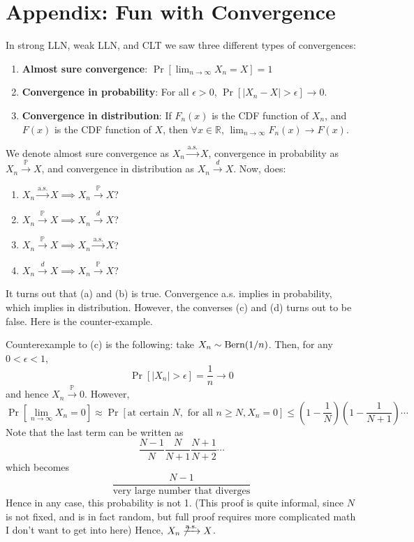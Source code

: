 \documentclass[11pt]{article}
\theoremstyle{definition}
\theoremstyle{remark}
\newcommand{\convas}{\xrightarrow{\text{a.s.}}}
\newcommand{\convprob}{\xrightarrow{\mathbb{P}}}
\newcommand{\convdist}{\xrightarrow{d}}
\newcommand{\R}{\mathbb{R}}
\newcommand{\Bern}{\textnormal{Bern}}
\begin{document}
\pagebreak

\section{Appendix: Fun with Convergence}

In strong LLN, weak LLN, and CLT we saw three different types of convergences:
\begin{enumerate}
    \item \textbf{Almost sure convergence}: $\Pr[ \lim_{n \to \infty} X_n = X] = 1$
    \item \textbf{Convergence in probability}: For all $\epsilon > 0$, $\Pr[ |X_n - X| > \epsilon ] \to 0$.
    \item \textbf{Convergence in distribution}: If $F_n(x)$ is the CDF function of $X_n$, and $F(x)$ is the CDF function of $X$, then $\forall x \in \R$, $\lim_{n \to \infty} F_n(x) \to F(x)$. 
\end{enumerate}

We denote almost sure convergence as $X_n \convas X$, convergence in probability as $X_n \convprob X$, and convergence in distribution as $X_n \convdist X$. Now, does:

\begin{enumerate}[label = (\alph*)]
    \item $X_n \convas X \implies X_n \convprob X$?
    \item $X_n \convprob X \implies X_n \convdist X$?
    \item $X_n \convprob X \implies X_n \convas X$?
    \item $X_n \convdist X \implies X_n \convprob X$?
\end{enumerate}

It turns out that (a) and (b) is true. Convergence a.s. implies in probability, which implies in distribution. However, the converses (c) and (d) turns out to be false. Here is the counter-example.

Counterexample to (c) is the following: take $X_n \sim \Bern(1/n)$. Then, for any $0 < \epsilon < 1$, $$\Pr[|X_n|> \epsilon ] = \frac{1}{n} \to 0 $$ and hence $X_n \convprob 0$. However, $$\Pr[ \lim_{n \to \infty} X_n = 0] \approx \Pr\left[ \text{at certain }N, \text{ for all } n \geq N, X_n = 0 \right] \leq \left(1 - \frac{1}{N}\right)\left(1 - \frac{1}{N+1}\right) \cdots $$ Note that the last term can be written as $$ \frac{N-1}{N} \frac{N}{N+1} \frac{N+1}{N+2} \cdots $$ which becomes $$\frac{N-1}{\text{very large number that diverges}}$$ Hence in any case, this probability is not 1. (This proof is quite informal, since $N$ is not fixed, and is in fact random, but full proof requires more complicated math I don't want to get into here) Hence, $X_n \not\convas X$.
\end{document}
